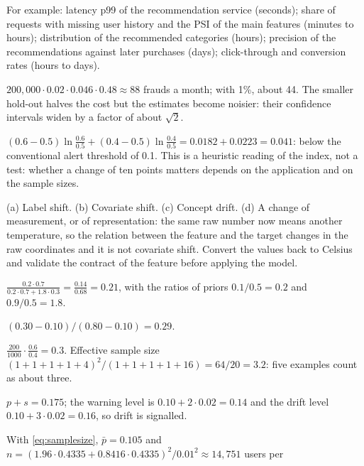 \begin{description}[font=\bfseries,leftmargin=0pt,itemsep=5pt]
  \item[\ref{exr6:plan}] For example: latency p99 of the recommendation service (seconds); share of requests with missing user history
        and the PSI of the main features (minutes to hours); distribution of the recommended categories (hours); precision of the
        recommendations against later purchases (days); click-through and conversion rates (hours to days).
  \item[\ref{exr6:holdout}] $200{,}000\cdot0.02\cdot0.046\cdot0.48\approx88$ frauds a month; with 1\%, about 44. The smaller hold-out halves
        the cost but the estimates become noisier: their confidence intervals widen by a factor of about $\sqrt2$.
  \item[\ref{exr6:psi}] $(0.6-0.5)\ln\frac{0.6}{0.5}+(0.4-0.5)\ln\frac{0.4}{0.5}=0.0182+0.0223=0.041$: below the conventional alert threshold of 0.1.
        This is a heuristic reading of the index, not a test: whether a change of ten points matters depends
        on the application and on the sample sizes.
  \item[\ref{exr6:types}] (a) Label shift. (b) Covariate shift. (c) Concept drift. (d) A change of measurement, or of representation: the same raw number now
        means another temperature, so the relation between the feature and the target changes in the raw
        coordinates and it is not covariate shift. Convert the values back to Celsius and validate the contract
        of the feature before applying the model.
  \item[\ref{exr6:saerens}] $\frac{0.2\cdot0.7}{0.2\cdot0.7+1.8\cdot0.3}=\frac{0.14}{0.68}=0.21$, with the ratios of priors $0.1/0.5=0.2$ and
        $0.9/0.5=1.8$.
  \item[\ref{exr6:acc}] $(0.30-0.10)/(0.80-0.10)=0.29$.
  \item[\ref{exr6:weights}] $\frac{200}{1000}\cdot\frac{0.6}{0.4}=0.3$. Effective sample size $(1+1+1+1+4)^2/(1+1+1+1+16)=64/20=3.2$: five
        examples count as about three.
  \item[\ref{exr6:ddm}] $p+s=0.175$; the warning level is $0.10+2\cdot0.02=0.14$ and the drift level $0.10+3\cdot0.02=0.16$, so drift is
        signalled.
  \item[\ref{exr6:size}] With \cref{eq:samplesize}, $\bar p=0.105$ and $n=(1.96\cdot0.4335+0.8416\cdot0.4335)^2/0.01^2\approx14{,}751$ users per

\end{description}
